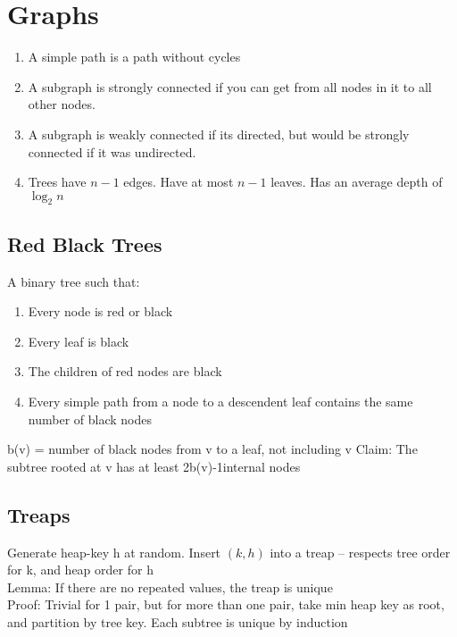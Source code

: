 \documentclass[12pt,twocolumn]{article}
\begin{document}
\section{Graphs}
\begin{enumerate}
    \item A simple path is a path without cycles
    \item A subgraph is strongly connected if you can get from all nodes in it to all other nodes.
    \item A subgraph is weakly connected if its directed, but would be strongly connected if it was undirected.
    \item Trees have $n-1$ edges. Have at most $n-1$ leaves. Has an average depth of $\log_2 n$
\end{enumerate}

\subsection{Red Black Trees}
A binary tree such that:
\begin{enumerate}
\item Every node is red or black
\item Every leaf is black
\item The children of red nodes are black
\item Every simple path from a node to a descendent leaf contains the same number of black nodes
\end{enumerate}
b(v) = number of black nodes from v to a leaf, not including v
Claim: The subtree rooted at v has at least 2b(v)-1internal nodes

\subsection{Treaps}
Generate heap-key h at random.  Insert $(k, h)$ into a treap -- respects tree order for k, and heap order for h\\
Lemma: If there are no repeated values, the treap is unique\\
Proof: Trivial for 1 pair, but for more than one pair, take min heap key as root, and partition by tree key.  Each subtree is unique by induction\\
\end{document}

